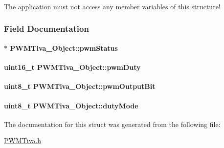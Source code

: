 The application must not access any member variables of this structure! 

\subsubsection{Field Documentation}
\paragraph[{pwm\-Status}]{$\ast$ P\-W\-M\-Tiva\-\_\-\-Object\-::pwm\-Status}\label{struct_p_w_m_tiva___object_ac8bd4faf595db91eed648925028a8ee2}
\paragraph[{pwm\-Duty}]{\setlength{\rightskip}{0pt plus 5cm}uint16\-\_\-t P\-W\-M\-Tiva\-\_\-\-Object\-::pwm\-Duty}\label{struct_p_w_m_tiva___object_a800cd6659e683499a1d10781f6dd8039}
\paragraph[{pwm\-Output\-Bit}]{\setlength{\rightskip}{0pt plus 5cm}uint8\-\_\-t P\-W\-M\-Tiva\-\_\-\-Object\-::pwm\-Output\-Bit}\label{struct_p_w_m_tiva___object_a2495251d43ff49e93db61ffaf060225b}
\paragraph[{duty\-Mode}]{\setlength{\rightskip}{0pt plus 5cm}uint8\-\_\-t P\-W\-M\-Tiva\-\_\-\-Object\-::duty\-Mode}\label{struct_p_w_m_tiva___object_a55f216f7bf6438a120a7f0b52726ad55}


The documentation for this struct was generated from the following file\-:\begin{DoxyCompactItemize}
\item 
\hyperlink{_p_w_m_tiva_8h}{P\-W\-M\-Tiva.\-h}\end{DoxyCompactItemize}
